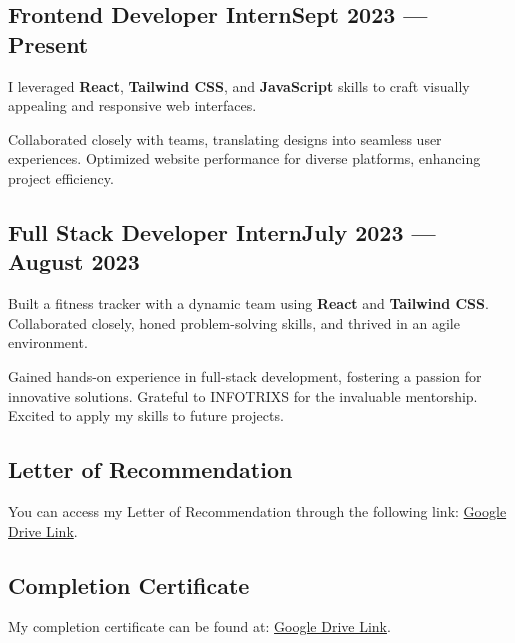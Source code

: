 \subsection{{Frontend Developer Intern\hfill Sept 2023 --- Present }}
\begin{zitemize}
    \item I leveraged \textbf{React}, \textbf{Tailwind CSS}, and \textbf{JavaScript} skills to craft visually appealing and responsive web interfaces. 
    \item Collaborated closely with teams, translating designs into seamless user experiences. Optimized website performance for diverse platforms, enhancing project efficiency.
\end{zitemize}


\subsection{{Full Stack Developer Intern\hfill July 2023 --- August 2023}}
\begin{zitemize}
    \item Built a fitness tracker with a dynamic team using \textbf{React} and \textbf{Tailwind CSS}. Collaborated closely, honed problem-solving skills, and thrived in an agile environment. 
    \item Gained hands-on experience in full-stack development, fostering a passion for innovative solutions. Grateful to INFOTRIXS for the invaluable mentorship. Excited to apply my skills to future projects.
\end{zitemize}
\begin{zitemize}
\subsection{{Letter of Recommendation}}
\item You can access my Letter of Recommendation through the following link: \href{https://drive.google.com/file/d/1CgP45vZIpdOrJJdlWFLo5sY55WQj5FiL/view?usp=drivesdk}{Google Drive Link}.
\end{zitemize}
\begin{zitemize}
\subsection{{Completion Certificate}}
\item My completion certificate can be found at: \href{https://drive.google.com/file/d/1DF9omNonCkAQRWrWYLqhWcF5RD2DxaC6/view?usp=drivesdk}{Google Drive Link}.
\end{zitemize}


